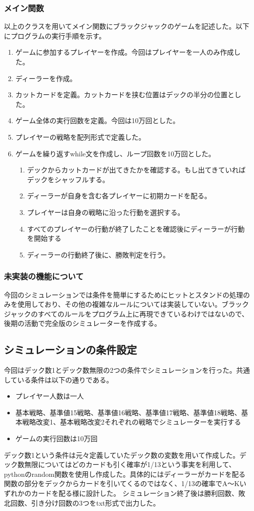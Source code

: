 \subsubsection{メイン関数}
以上のクラスを用いてメイン関数にブラックジャックのゲームを記述した。以下にプログラムの実行手順を示す。
\begin{enumerate}
    \item ゲームに参加するプレイヤーを作成。今回はプレイヤーを一人のみ作成した。
    \item ディーラーを作成。
    \item カットカードを定義。カットカードを挟む位置はデックの半分の位置とした。
    \item ゲーム全体の実行回数を定義。今回は10万回とした。
    \item プレイヤーの戦略を配列形式で定義した。
    \item ゲームを繰り返すwhile文を作成し、ループ回数を10万回とした。
    \begin{enumerate}
        \item デックからカットカードが出てきたかを確認する。もし出てきていればデックをシャッフルする。
	  \item ディーラーが自身を含む各プレイヤーに初期カードを配る。
	  \item プレイヤーは自身の戦略に沿った行動を選択する。
	  \item すべてのプレイヤーの行動が終了したことを確認後にディーラーが行動を開始する
	  \item ディーラーの行動終了後に、勝敗判定を行う。
    \end{enumerate}
\end{enumerate}

\subsubsection{未実装の機能について}
今回のシミュレーションでは条件を簡単にするためにヒットとスタンドの処理のみを使用しており、その他の複雑なルールについては実装していない。ブラックジャックのすべてのルールをプログラム上に再現できているわけではないので、後期の活動で完全版のシミュレーターを作成する。

\subsection{シミュレーションの条件設定}
今回はデック数1とデック数無限の2つの条件でシミュレーションを行った。共通している条件は以下の通りである。
\begin{itemize}
\item プレイヤー人数は一人
\item 基本戦略、基準値15戦略、基準値16戦略、基準値17戦略、基準値18戦略、基本戦略改変1、基本戦略改変2それぞれの戦略でシミュレーターを実行する
\item ゲームの実行回数は10万回
\end{itemize}

デック数1という条件は元々定義していたデック数の変数を用いて作成した。デック数無限についてはどのカードも引く確率が1/13という事実を利用して、pythonのrandom関数を使用し作成した。具体的にはディーラーがカードを配る関数の部分をデックからカードを引いてくるのではなく、1/13の確率でA～Kいずれかのカードを配る様に設計した。
シミュレーション終了後は勝利回数、敗北回数、引き分け回数の3つをtxt形式で出力した。
